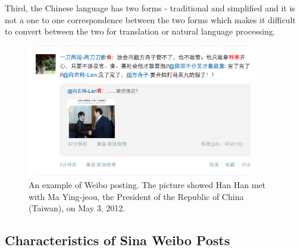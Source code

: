 \documentclass[11pt]{article}
\newcommand{\1}[1]{{\mathbf 1}\left\{#1\right\}}        %
\begin{document}
Third, the Chinese language has two forms - traditional and simplified and it is not a one to one correspondence between the two forms which makes it difficult to convert between the two for translation or natural language processing. 


\begin{center}
\begin{figure}[!h]
   \centering
   \includegraphics[width=0.9\textwidth]{./slides/weiboEg.png} 
      \caption{An example of Weibo posting. The picture showed Han Han met with Ma Ying-jeou, the President of the Republic of China (Taiwan), on May 3, 2012.}
   \label{fig:weiboex}
\end{figure}
\end{center}

\subsection{Characteristics of Sina Weibo Posts}\label{subsubsec:Weibo}
\end{document}
